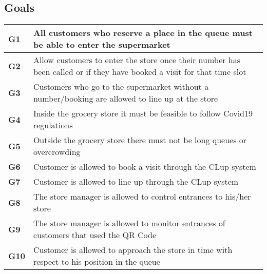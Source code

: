 \subsection{Goals}
\begin{center}
    {\renewcommand{\arraystretch}{2}%
    \begin{tabular}{L{2cm}L{12cm}}
        \hline
        \textbf{G1} & All customers who reserve a place in the queue must be able to enter the supermarket \\
        \hline
        \textbf{G2} & Allow customers to enter the store once their number has been called or if they have booked a visit for that time slot \\
        \hline
        \textbf{G3} & Customers who go to the supermarket without a number/booking are allowed to line up at the store \\
        \hline
        \textbf{G4} & Inside the grocery store it must be feasible to follow Covid19 regulations \\
        \hline
        \textbf{G5} & Outside the grocery store there must not be long queues or overcrowding \\
        \hline
        \textbf{G6} & Customer is allowed to book a visit through the CLup system \\
        \hline
        \textbf{G7} & Customer is allowed to line up through the CLup system \\
        \hline
        \textbf{G8} & The store manager is allowed to control entrances to his/her store \\
        \hline
        \textbf{G9} & The store manager is allowed to monitor entrances of customers that used the QR Code \\
        \hline
        \textbf{G10} & Customer is allowed to approach the store in time with respect to his position in the queue \\
        \hline
    \end{tabular}}
\end{center}